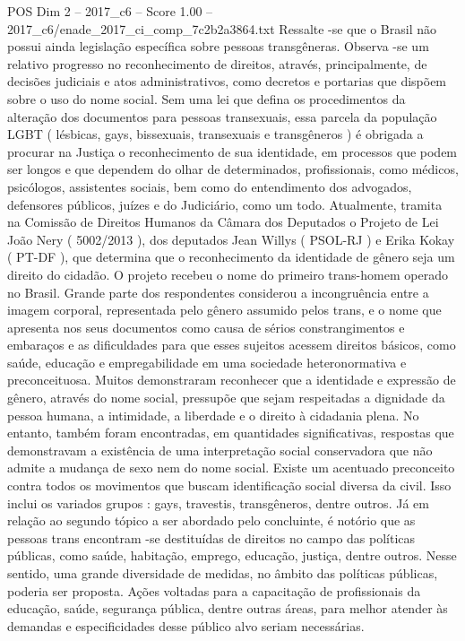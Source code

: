 \begin{textsample}{POS Dim 2 – 2017\_c6 – Score 1.00 – 2017\_c6/enade\_2017\_ci\_comp\_7c2b2a3864.txt}
Ressalte -se que o Brasil não possui ainda legislação específica sobre pessoas transgêneras.
Observa -se um relativo progresso no reconhecimento de direitos, através, principalmente, de decisões judiciais e atos administrativos, como decretos e portarias que dispõem sobre o uso do nome social.
Sem uma lei que defina os procedimentos da alteração dos documentos para pessoas transexuais, essa parcela da população LGBT ( lésbicas, gays, bissexuais, transexuais e transgêneros ) é obrigada a procurar na Justiça o reconhecimento de sua identidade, em processos que podem ser longos e que dependem do olhar de determinados, profissionais, como médicos, psicólogos, assistentes sociais, bem como do entendimento dos advogados, defensores públicos, juízes e do Judiciário, como um todo.
Atualmente, tramita na Comissão de Direitos Humanos da Câmara dos Deputados o Projeto de Lei João Nery ( 5002/2013 ), dos deputados Jean Willys ( PSOL-RJ ) e Erika Kokay ( PT-DF ), que determina que o reconhecimento da identidade de gênero seja um direito do cidadão.
O projeto recebeu o nome do primeiro trans-homem operado no Brasil.
Grande parte dos respondentes considerou a incongruência entre a imagem corporal, representada pelo gênero assumido pelos trans, e o nome que apresenta nos seus documentos como causa de sérios constrangimentos e embaraços e as dificuldades para que esses sujeitos acessem direitos básicos, como saúde, educação e empregabilidade em uma sociedade heteronormativa e preconceituosa.
Muitos demonstraram reconhecer que a identidade e expressão de gênero, através do nome social, pressupõe que sejam respeitadas a dignidade da pessoa humana, a intimidade, a liberdade e o direito à cidadania plena.
No entanto, também foram encontradas, em quantidades significativas, respostas que demonstravam a existência de uma interpretação social conservadora que não admite a mudança de sexo nem do nome social.
Existe um acentuado preconceito contra todos os movimentos que buscam identificação social diversa da civil.
Isso inclui os variados grupos : gays, travestis, transgêneros, dentre outros.
Já em relação ao segundo tópico a ser abordado pelo concluinte, é notório que as pessoas trans encontram -se destituídas de direitos no campo das políticas públicas, como saúde, habitação, emprego, educação, justiça, dentre outros.
Nesse sentido, uma grande diversidade de medidas, no âmbito das políticas públicas, poderia ser proposta.
Ações voltadas para a capacitação de profissionais da educação, saúde, segurança pública, dentre outras áreas, para melhor atender às demandas e especificidades desse público alvo seriam necessárias.

\end{textsample}
